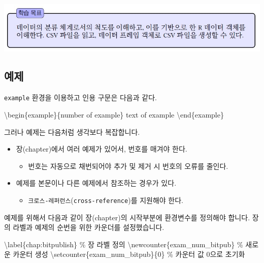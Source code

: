\documentclass[
  letterpaper,
]{book}
\newenvironment{Shaded}{\begin{snugshade}}{\end{snugshade}}
\newcommand{\CommentTok}[1]{\textcolor[rgb]{0.37,0.37,0.37}{#1}}
\newcommand{\ExtensionTok}[1]{\textcolor[rgb]{0.00,0.23,0.31}{#1}}
\newcommand{\FunctionTok}[1]{\textcolor[rgb]{0.28,0.35,0.67}{#1}}
\newcommand{\KeywordTok}[1]{\textcolor[rgb]{0.00,0.23,0.31}{#1}}
\newcommand{\NormalTok}[1]{\textcolor[rgb]{0.00,0.23,0.31}{#1}}
\providecommand{\tightlist}{%
  \setlength{\itemsep}{0pt}\setlength{\parskip}{0pt}}\usepackage{longtable,booktabs,array}
\begin{document}
\includegraphics{images/titlebox.jpg}

\hypertarget{uxc608uxc81c}{%
\subsection{예제}\label{uxc608uxc81c}}

\texttt{example} 환경을 이용하고 인용 구문은 다음과 같다.

\begin{Shaded}
\begin{Highlighting}[]
\KeywordTok{\textbackslash{}begin}\NormalTok{\{}\ExtensionTok{example}\NormalTok{\}\{number of example\}}
\NormalTok{  text of example}
\KeywordTok{\textbackslash{}end}\NormalTok{\{}\ExtensionTok{example}\NormalTok{\}}
\end{Highlighting}
\end{Shaded}

그러나 예제는 다음처럼 생각보다 복잡합니다.

\begin{itemize}
\tightlist
\item
  장(chapter)에서 여러 예제가 있어서, 번호를 매겨야 한다.

  \begin{itemize}
  \tightlist
  \item
    번호는 자동으로 채번되어야 추가 및 제거 시 번호의 오류를 줄인다.
  \end{itemize}
\item
  예제를 본문이나 다른 예제에서 참조하는 경우가 있다.

  \begin{itemize}
  \tightlist
  \item
    \texttt{크로스-레퍼런스}(\texttt{cross-reference})를
    지원해야 한다.
  \end{itemize}
\end{itemize}

예제를 위해서 다음과 같이 장(chapter)의 시작부분에 환경변수를 정의해야
합니다. 장의 라벨과 예제의 순번을 위한 카운더를 설정했습니다.

\begin{Shaded}
\begin{Highlighting}[]
\KeywordTok{\textbackslash{}label}\NormalTok{\{}\ExtensionTok{chap:bitpublish}\NormalTok{\}                    }\CommentTok{\% 장 라벨 정의}
\FunctionTok{\textbackslash{}newcounter}\NormalTok{\{exam\_num\_bitpub\}               }\CommentTok{\% 새로운 카운터 생성}
\FunctionTok{\textbackslash{}setcounter}\NormalTok{\{exam\_num\_bitpub\}\{0\}            }\CommentTok{\% 카운터 값 0으로 초기화}
\end{Highlighting}
\end{Shaded}
\end{document}
